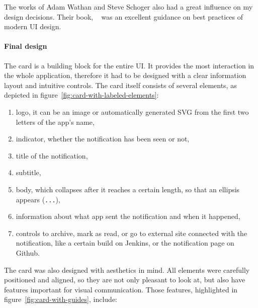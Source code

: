 The works of Adam Wathan and Steve Schoger
also had a great influence
on my design decisions.
Their book,
~\cite{wathan_refactoring_2018}
was an excellent guidance on best practices
of modern \ac{UI} design.

\paragraph*{Final design}\label{sec:final-design}

The card is a building block for the entire \ac{UI}.
It provides the most interaction in the whole application,
therefore it had to be designed with a clear information layout
and intuitive controls.
The card itself consists of several elements,
as depicted in figure~\ref{fig:card-with-labeled-elements}:

\begin{enumerate}
  \item
        logo,
        it can be an image
        or automatically generated \ac{SVG}
        from the first two letters of the app's name,
  \item
        indicator,
        whether the notification has been seen or not,
  \item
        title of the notification,
  \item
        subtitle,
  \item
        body,
        which collapses after it reaches a certain length,
        so that an ellipsis appears (\texttt{...}),
  \item
        information about what app sent the notification and when it happened,
  \item
        controls to archive,
        mark as read,
        or go to external site connected with the notification,
        like a certain build on Jenkins,
        or the notification page on Github.
\end{enumerate}

The card was also designed with aesthetics in mind.
All elements were carefully positioned and aligned,
so they are not only pleasant to look at,
but also have features important for visual communication.
Those features, highlighted in figure~\ref{fig:card-with-guides}, include:


